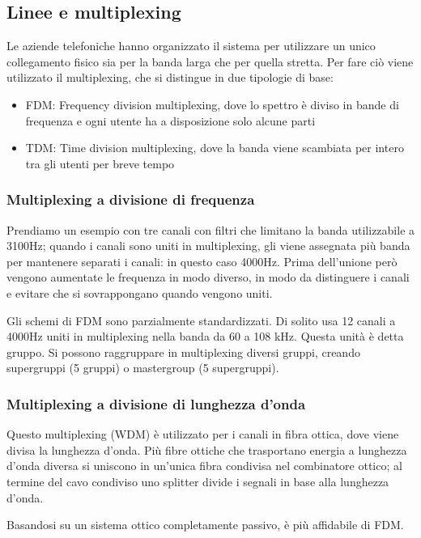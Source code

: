 \subsection{Linee e multiplexing}
Le aziende telefoniche hanno organizzato il sistema per utilizzare un unico collegamento fisico sia per la banda larga che per quella stretta.
Per fare ciò viene utilizzato il multiplexing, che si distingue in due tipologie di base:
\begin{itemize}
    \item FDM: Frequency division multiplexing, dove lo spettro è diviso in bande di frequenza e ogni utente ha a disposizione solo alcune parti
    \item TDM: Time division multiplexing, dove la banda viene scambiata per intero tra gli utenti per breve tempo
\end{itemize}

\subsubsection{Multiplexing a divisione di frequenza}
Prendiamo un esempio con tre canali con filtri che limitano la banda utilizzabile a 3100Hz;
quando i canali sono uniti in multiplexing, gli viene assegnata più banda per mantenere separati i canali: in questo caso 4000Hz.
Prima dell'unione però vengono aumentate le frequenza in modo diverso, in modo da distinguere i canali e evitare che si sovrappongano quando vengono uniti.

Gli schemi di FDM sono parzialmente standardizzati.
Di solito usa 12 canali a 4000Hz uniti in multiplexing nella banda da 60 a 108 kHz.
Questa unità è detta gruppo. Si possono raggruppare in multiplexing diversi gruppi, creando supergruppi (5 gruppi) o mastergroup (5 supergruppi).

\subsubsection{Multiplexing a divisione di lunghezza d'onda}
Questo multiplexing (WDM) è utilizzato per i canali in fibra ottica, dove viene divisa la lunghezza d'onda.
Più fibre ottiche che trasportano energia a lunghezza d'onda diversa si uniscono in un'unica fibra condivisa nel combinatore ottico;
al termine del cavo condiviso uno splitter divide i segnali in base alla lunghezza d'onda.

Basandosi su un sistema ottico completamente passivo, è più affidabile di FDM.

